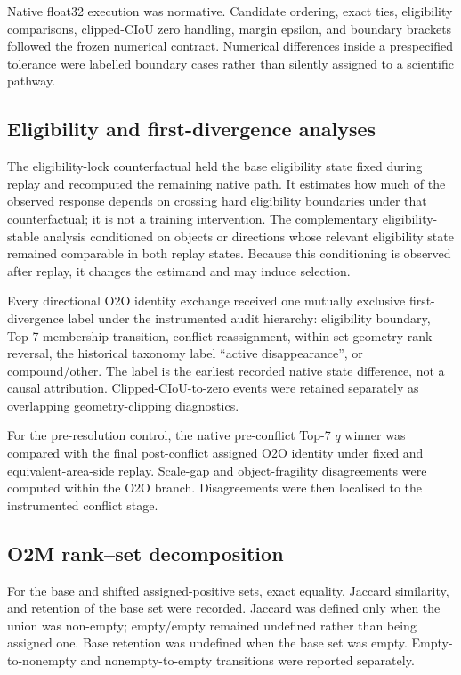 Native float32 execution was normative. Candidate ordering, exact ties, eligibility comparisons, clipped-CIoU zero handling, margin epsilon, and boundary brackets followed the frozen numerical contract. Numerical differences inside a prespecified tolerance were labelled boundary cases rather than silently assigned to a scientific pathway.

\subsection{Eligibility and first-divergence analyses}

The eligibility-lock counterfactual held the base eligibility state fixed during replay and recomputed the remaining native path. It estimates how much of the observed response depends on crossing hard eligibility boundaries under that counterfactual; it is not a training intervention. The complementary eligibility-stable analysis conditioned on objects or directions whose relevant eligibility state remained comparable in both replay states. Because this conditioning is observed after replay, it changes the estimand and may induce selection.

Every directional O2O identity exchange received one mutually exclusive first-divergence label under the instrumented audit hierarchy: eligibility boundary, Top-7 membership transition, conflict reassignment, within-set geometry rank reversal, the historical taxonomy label ``active disappearance'', or compound/other. The label is the earliest recorded native state difference, not a causal attribution. Clipped-CIoU-to-zero events were retained separately as overlapping geometry-clipping diagnostics.

For the pre-resolution control, the native pre-conflict Top-7 $q$ winner was compared with the final post-conflict assigned O2O identity under fixed and equivalent-area-side replay. Scale-gap and object-fragility disagreements were computed within the O2O branch. Disagreements were then localised to the instrumented conflict stage.

\subsection{O2M rank--set decomposition}

For the base and shifted assigned-positive sets, exact equality, Jaccard similarity, and retention of the base set were recorded. Jaccard was defined only when the union was non-empty; empty/empty remained undefined rather than being assigned one. Base retention was undefined when the base set was empty. Empty-to-nonempty and nonempty-to-empty transitions were reported separately.

